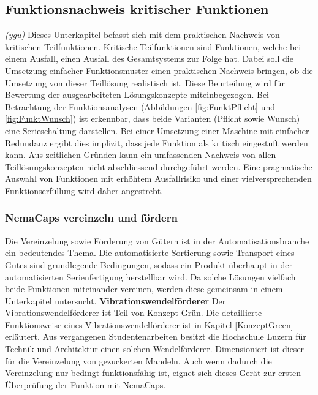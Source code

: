 \subsection{Funktionsnachweis kritischer Funktionen}
\label{funktionsnachweis}
\textit{(ygu)} Dieses Unterkapitel befasst sich mit dem praktischen Nachweis von kritischen Teilfunktionen. Kritische Teilfunktionen sind Funktionen, welche bei einem Ausfall, einen Ausfall des Gesamtsystems zur Folge hat. Dabei soll die Umsetzung einfacher Funktionsmuster einen praktischen Nachweis bringen, ob die Umsetzung von dieser Teillösung realistisch ist. Diese Beurteilung wird für Bewertung der ausgearbeiteten Lösungskonzepte miteinbegezogen.
\newline
Bei Betrachtung der Funktionsanalysen (Abbildungen \ref{fig:FunktPflicht} und \ref{fig:FunktWunsch}) ist erkennbar, dass beide Varianten (Pflicht sowie Wunsch) eine Serieschaltung darstellen. Bei einer Umsetzung einer Maschine mit einfacher Redundanz ergibt dies implizit, dass jede Funktion als kritisch eingestuft werden kann. Aus zeitlichen Gründen kann ein umfassenden Nachweis von allen Teillösungskonzepten nicht abschliessend durchgeführt werden. Eine pragmatische Auswahl von Funktionen mit erhöhtem Ausfallrisiko und einer vielversprechenden Funktionserfüllung wird daher angestrebt.

\subsubsection{NemaCaps vereinzeln und fördern}
Die Vereinzelung sowie Förderung von Gütern ist in der Automatisationsbranche ein bedeutendes Thema. Die automatisierte Sortierung sowie Transport eines Gutes sind grundlegende Bedingungen, sodass ein Produkt überhaupt in der automatisierten Serienfertigung herstellbar wird. Da solche Lösungen vielfach beide Funktionen miteinander vereinen, werden diese gemeinsam in einem Unterkapitel untersucht.
\newline
\newline
\textbf{Vibrationswendelförderer}
\newline
Der Vibrationswendelförderer ist Teil von Konzept Grün. Die detaillierte Funktionsweise eines Vibrationswendelförderer ist in Kapitel \ref{KonzeptGreen} erläutert.
\newline
Aus vergangenen Studentenarbeiten besitzt die Hochschule Luzern für Technik und Architektur einen solchen Wendelförderer. Dimensioniert ist dieser für die Vereinzelung von gezuckerten Mandeln. Auch wenn dadurch die Vereinzelung nur bedingt funktionsfähig ist, eignet sich dieses Gerät zur ersten Überprüfung der Funktion mit NemaCaps. 

